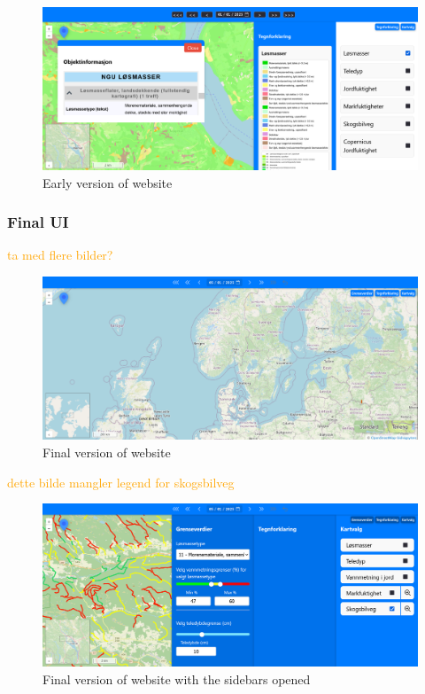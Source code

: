 \begin{figure}[h]
    \centering
    \includegraphics[width=1\linewidth]{figures/website_layout_v1.pdf}
    \caption{Early version of website}
    \label{fig:website_layout_v1}
\end{figure}

\subsubsection*{Final UI}

\textcolor{orange}{ta med flere bilder?}

\begin{figure}[h]
    \centering
    \includegraphics[width=1\linewidth]{figures/website_layout_final.pdf}
    \caption{Final version of website}
    \label{fig:website_layout_final}
\end{figure}


\textcolor{orange}{dette bilde mangler legend for skogsbilveg}
\begin{figure}[h]
    \centering
    \includegraphics[width=1\linewidth]{figures/website_layout_final_sidebars.png}
    \caption{Final version of website with the sidebars opened}
    \label{fig:website_layout_final_sidbars}
\end{figure}

